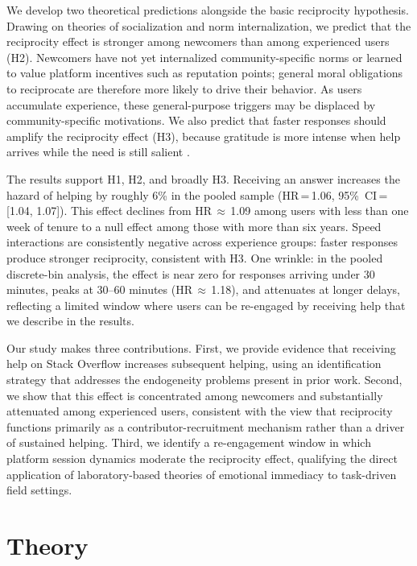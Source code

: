We develop two theoretical predictions alongside the basic reciprocity hypothesis. Drawing on theories of socialization and norm internalization, we predict that the reciprocity effect is stronger among newcomers than among experienced users (H2). Newcomers have not yet internalized community-specific norms or learned to value platform incentives such as reputation points; general moral obligations to reciprocate are therefore more likely to drive their behavior. As users accumulate experience, these general-purpose triggers may be displaced by community-specific motivations. We also predict that faster responses should amplify the reciprocity effect (H3), because gratitude is more intense when help arrives while the need is still salient \citep{mccullough_is_2001, tsang_gratitude_2006}.

The results support H1, H2, and broadly H3. Receiving an answer increases the hazard of helping by roughly 6\% in the pooled sample (HR\,=\,1.06, 95\%~CI\,=\,[1.04, 1.07]). This effect declines from HR\,$\approx$\,1.09 among users with less than one week of tenure to a null effect among those with more than six years. Speed interactions are consistently negative across experience groups: faster responses produce stronger reciprocity, consistent with H3. One wrinkle: in the pooled discrete-bin analysis, the effect is near zero for responses arriving under 30 minutes, peaks at 30--60 minutes (HR\,$\approx$\,1.18), and attenuates at longer delays, reflecting a limited window where users can be re-engaged by receiving help that we describe in the results.

Our study makes three contributions. First, we provide evidence that receiving help on Stack Overflow increases subsequent helping, using an identification strategy that addresses the endogeneity problems present in prior work. Second, we show that this effect is concentrated among newcomers and substantially attenuated among experienced users, consistent with the view that reciprocity functions primarily as a contributor-recruitment mechanism rather than a driver of sustained helping. Third, we identify a re-engagement window in which platform session dynamics moderate the reciprocity effect, qualifying the direct application of laboratory-based theories of emotional immediacy to task-driven field settings.

\section{Theory}

